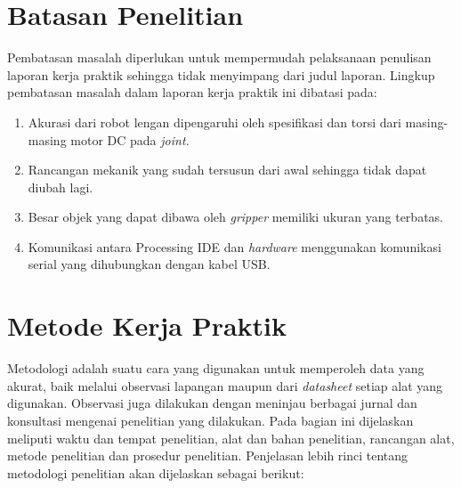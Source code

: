 \section{Batasan Penelitian}
Pembatasan masalah diperlukan untuk mempermudah pelaksanaan penulisan laporan kerja praktik sehingga tidak menyimpang dari judul laporan. Lingkup pembatasan masalah dalam laporan kerja praktik ini dibatasi pada:

\begin{enumerate}
	
	\item Akurasi dari robot lengan dipengaruhi oleh spesifikasi dan torsi dari masing-masing motor DC pada \emph{ joint.}
	\item  Rancangan mekanik yang sudah tersusun dari awal sehingga tidak dapat diubah lagi. 
	\item Besar objek yang dapat dibawa oleh \textit{gripper} memiliki ukuran yang terbatas.
	\item Komunikasi antara Processing IDE dan \textit{hardware} menggunakan komunikasi serial yang dihubungkan dengan kabel USB.
	
\end{enumerate}

\section{Metode Kerja Praktik}
Metodologi adalah suatu cara yang digunakan untuk memperoleh data yang akurat, baik melalui observasi lapangan maupun dari \emph {datasheet} setiap alat yang digunakan. Observasi juga dilakukan dengan meninjau berbagai jurnal dan konsultasi mengenai penelitian yang dilakukan. Pada bagian ini dijelaskan meliputi waktu dan tempat penelitian, alat dan bahan penelitian, rancangan alat, metode penelitian dan prosedur penelitian. Penjelasan lebih rinci tentang metodologi penelitian akan dijelaskan sebagai berikut: 

